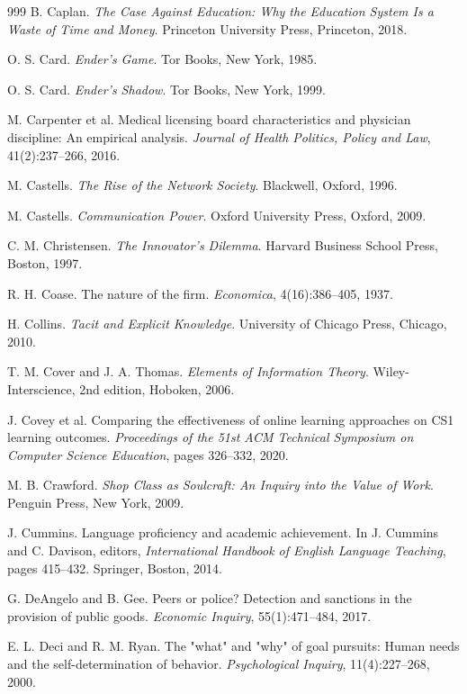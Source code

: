 \documentclass[11pt]{article}
\begin{document}
\begin{thebibliography}{999}
B. Caplan.
\textit{The Case Against Education: Why the Education System Is a Waste of Time and Money}.
Princeton University Press, Princeton, 2018.

O. S. Card.
\textit{Ender's Game}.
Tor Books, New York, 1985.

O. S. Card.
\textit{Ender's Shadow}.
Tor Books, New York, 1999.

M. Carpenter et al.
Medical licensing board characteristics and physician discipline: An empirical analysis.
\textit{Journal of Health Politics, Policy and Law}, 41(2):237--266, 2016.

M. Castells.
\textit{The Rise of the Network Society}.
Blackwell, Oxford, 1996.

M. Castells.
\textit{Communication Power}.
Oxford University Press, Oxford, 2009.

C. M. Christensen.
\textit{The Innovator's Dilemma}.
Harvard Business School Press, Boston, 1997.

R. H. Coase.
The nature of the firm.
\textit{Economica}, 4(16):386--405, 1937.

H. Collins.
\textit{Tacit and Explicit Knowledge}.
University of Chicago Press, Chicago, 2010.

T. M. Cover and J. A. Thomas.
\textit{Elements of Information Theory}.
Wiley-Interscience, 2nd edition, Hoboken, 2006.

J. Covey et al.
Comparing the effectiveness of online learning approaches on CS1 learning outcomes.
\textit{Proceedings of the 51st ACM Technical Symposium on Computer Science Education}, pages 326--332, 2020.

M. B. Crawford.
\textit{Shop Class as Soulcraft: An Inquiry into the Value of Work}.
Penguin Press, New York, 2009.

J. Cummins.
Language proficiency and academic achievement.
In J. Cummins and C. Davison, editors,
\textit{International Handbook of English Language Teaching}, pages 415--432.
Springer, Boston, 2014.

G. DeAngelo and B. Gee.
Peers or police? Detection and sanctions in the provision of public goods.
\textit{Economic Inquiry}, 55(1):471--484, 2017.

E. L. Deci and R. M. Ryan.
The "what" and "why" of goal pursuits: Human needs and the self-determination of behavior.
\textit{Psychological Inquiry}, 11(4):227--268, 2000.


\end{thebibliography}
\end{document}
